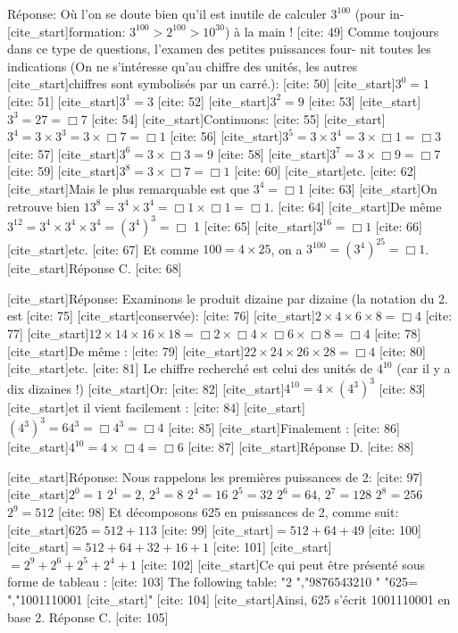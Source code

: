 Réponse: Où l'on se doute bien qu'il est inutile de calculer $3^{100}$ (pour in-
[cite_start]formation: $3^{100}>2^{100}>10^{30}$) à la main ! [cite: 49]
Comme toujours dans ce type de questions, l'examen des petites puissances four-
nit toutes les indications (On ne s'intéresse qu'au chiffre des unités, les autres
[cite_start]chiffres sont symbolisés par un carré.): [cite: 50]
[cite_start]$3^{0}=1$ [cite: 51]
[cite_start]$3^{1}=3$ [cite: 52]
[cite_start]$3^{2}=9$ [cite: 53]
[cite_start]$3^{3}=27=\Box7$ [cite: 54]
[cite_start]Continuons: [cite: 55]
[cite_start]$3^{4}=3\times3^{3}=3\times\Box7=\Box1$ [cite: 56]
[cite_start]$3^{5}=3\times3^{4}=3\times\Box1=\Box3$ [cite: 57]
[cite_start]$3^{6}=3\times\Box3=9$ [cite: 58]
[cite_start]$3^{7}=3\times\Box9=\Box7$ [cite: 59]
[cite_start]$3^{8}=3\times\Box7=\Box1$ [cite: 60]
[cite_start]etc. [cite: 62]
[cite_start]Mais le plus remarquable est que $3^{4}=\Box1$ [cite: 63]
[cite_start]On retrouve bien $13^{8}=3^{4}\times3^{4}=\Box1\times\Box1=\Box1$. [cite: 64]
[cite_start]De même $3^{12}=3^{4}\times3^{4}\times3^{4}=(3^{4})^{3}=\Box$ 1 [cite: 65]
[cite_start]$3^{16}=\Box1$ [cite: 66]
[cite_start]etc. [cite: 67]
Et comme $100=4\times25$, on a $3^{100}=(3^{4})^{25}=\Box1$.
[cite_start]Réponse C. [cite: 68]

[cite_start]Réponse: Examinons le produit dizaine par dizaine (la notation du 2. est [cite: 75]
[cite_start]conservée): [cite: 76]
[cite_start]$2\times4\times6\times8=\Box4$ [cite: 77]
[cite_start]$12\times14\times16\times18=\Box2\times\Box4\times\Box6\times\Box8=\Box4$ [cite: 78]
[cite_start]De même : [cite: 79]
[cite_start]$22\times24\times26\times28=\Box4$ [cite: 80]
[cite_start]etc. [cite: 81]
Le chiffre recherché est celui des unités de $4^{10}$ (car il y a dix dizaines !)
[cite_start]Or: [cite: 82]
[cite_start]$4^{10}=4\times(4^{3})^{3}$ [cite: 83]
[cite_start]et il vient facilement : [cite: 84]
[cite_start]$(4^{3})^{3}=64^{3}=\Box4^{3}=\Box4$ [cite: 85]
[cite_start]Finalement : [cite: 86]
[cite_start]$4^{10}=4\times\Box4=\Box6$ [cite: 87]
[cite_start]Réponse D. [cite: 88]

[cite_start]Réponse: Nous rappelons les premières puissances de 2: [cite: 97]
[cite_start]$2^{0}=1$ $2^{1}=2$, $2^{3}=8$ $2^{4}=16$ $2^{5}=32$ $2^{6}=64$, $2^{7}=128$ $2^{8}=256$ $2^{9}=512$ [cite: 98]
Et décomposons 625 en puissances de 2, comme suit:
[cite_start]$625=512+113$ [cite: 99]
[cite_start]$=512+64+49$ [cite: 100]
[cite_start]$=512+64+32+16+1$ [cite: 101]
[cite_start]$=2^{9}+2^{6}+2^{5}+2^{4}+1$ [cite: 102]
[cite_start]Ce qui peut être présenté sous forme de tableau : [cite: 103]
The following table:
"2
","9876543210
"
"625=
","1001110001
[cite_start]" [cite: 104]
[cite_start]Ainsi, 625 s'écrit 1001110001 en base 2. Réponse C. [cite: 105]

